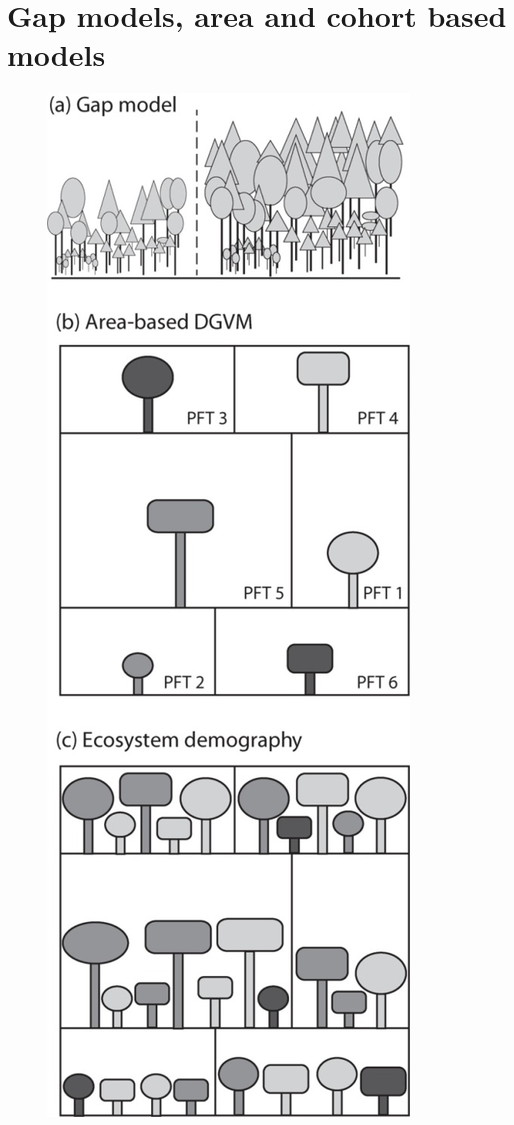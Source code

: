 \documentclass[12pt,oneside]{book}
\begin{document}
\section{Gap models, area and cohort based
models}\label{gap-models-area-and-cohort-based-models}

\begin{figure}

{\centering \includegraphics[width=0.8\linewidth]{figures/chap6/f63_3types} 

}
\end{figure}
\end{document}
